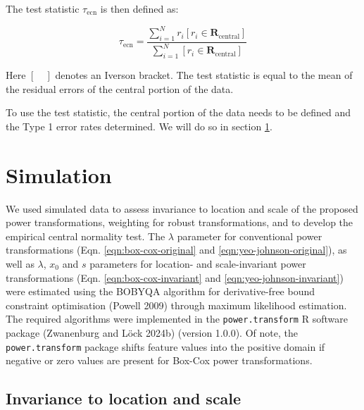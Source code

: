 \documentclass[preprint,12pt,authoryear]{elsarticle}
\begin{document}
The test statistic \(\tau_{\text{ecn}}\) is then defined as:

\begin{equation}
\tau_{\text{ecn}} = \frac{\sum_{i=1}^{N} r_i \left[r_i \in \mathbf{R}_{\text{central}}\right]}{\sum_{i=1}^N \left[r_i \in \mathbf{R}_{\text{central}}\right]} 
\end{equation}

Here \([\quad]\) denotes an Iverson bracket. The test statistic is equal
to the mean of the residual errors of the central portion of the data.

To use the test statistic, the central portion of the data needs to be
defined and the Type 1 error rates determined. We will do so in
section \ref{simulation}.

\section{Simulation}\label{simulation}

We used simulated data to assess invariance to location and scale of the
proposed power transformations, weighting for robust transformations,
and to develop the empirical central normality test. The \(\lambda\)
parameter for conventional power transformations (Eqn.
\ref{eqn:box-cox-original} and \ref{eqn:yeo-johnson-original}), as well
as \(\lambda\), \(x_0\) and \(s\) parameters for location- and
scale-invariant power transformations (Eqn. \ref{eqn:box-cox-invariant}
and \ref{eqn:yeo-johnson-invariant}) were estimated using the BOBYQA
algorithm for derivative-free bound constraint optimisation (Powell
2009) through maximum likelihood estimation. The required algorithms
were implemented in the \texttt{power.transform} R software package
(Zwanenburg and Löck 2024b) (version 1.0.0). Of note, the
\texttt{power.transform} package shifts feature values into the positive
domain if negative or zero values are present for Box-Cox power
transformations.

\subsection{Invariance to location and
scale}\label{invariance-to-location-and-scale}
\end{document}
